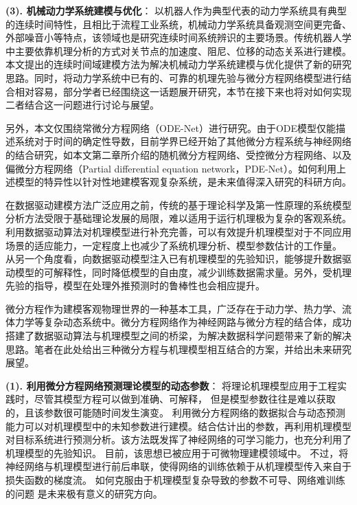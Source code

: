 \textbf{(3). 机械动力学系统建模与优化}：
以机器人作为典型代表的动力学系统具有典型的连续时间特性，且相比于流程工业系统，机械动力学系统具备观测空间更完备、外部噪音小等特点，该领域也是研究连续时间系统辨识的主要场景。传统机器人学中主要依靠机理分析的方式对关节点的加速度、阻尼、位移的动态关系进行建模。本文提出的连续时间域建模方法为解决机械动力学系统建模与优化提供了新的研究思路。同时，将动力学系统中已有的、可靠的机理先验与微分方程网络模型进行结合相对容易，部分学者已经围绕这一话题展开研究\cite{zhong2019symplectic,zhong2019symplectic}，本节在接下来也将对如何实现二者结合这一问题进行讨论与展望。

另外，本文仅围绕常微分方程网络（ODE-Net）进行研究。由于ODE模型仅能描述系统对于时间的确定性导数，目前学界已经开始了其他微分方程系统与神经网络的结合研究，如本文第二章所介绍的随机微分方程网络、受控微分方程网络、以及偏微分方程网络（Partial differential equation network，PDE-Net）。如何利用上述模型的特异性以针对性地建模客观复杂系统，是未来值得深入研究的科研方向。

在数据驱动建模方法广泛应用之前，传统的基于理论科学及第一性原理的系统模型分析方法受限于基础理论发展的局限，难以适用于运行机理极为复杂的客观系统。
利用数据驱动算法对机理模型进行补充完善，可以有效提升机理模型对于不同应用场景的适应能力，一定程度上也减少了系统机理分析、模型参数估计的工作量。
从另一个角度看，向数据驱动模型注入已有机理模型的先验知识，能够提升数据驱动模型的可解释性，同时降低模型的自由度，减少训练数据需求量。另外，受机理先验的指导，模型在处理外推预测时的鲁棒性也会相应提升。

微分方程作为建模客观物理世界的一种基本工具，广泛存在于动力学、热力学、流体力学等复杂动态系统中。微分方程网络作为神经网路与微分方程的结合体，成功搭建了数据驱动算法与机理模型之间的桥梁，为解决数据科学问题带来了新的解决思路。笔者在此处给出三种微分方程与机理模型相互结合的方案，并给出未来研究展望。

\textbf{(1). 利用微分方程网络预测理论模型的动态参数}：
将理论机理模型应用于工程实践时，尽管其模型方程可以做到准确、可解释，
但是模型参数往往是难以获取的，且该参数很可能随时间发生演变。
利用微分方程网络的数据拟合与动态预测能力可以对机理模型中的未知参数进行建模。结合估计出的参数，再利用机理模型对目标系统进行预测分析。该方法既发挥了神经网络的可学习能力，也充分利用了机理模型的先验知识。
目前，该思想已被应用于可微物理建模领域中\cite{takahashi2021differentiable}。
不过，将神经网络与机理模型进行前后串联，使得网络的训练依赖于从机理模型传入来自于损失函数的梯度流。
如何克服由于机理模型复杂导致的参数不可导、网络难训练的问题
是未来极有意义的研究方向。

